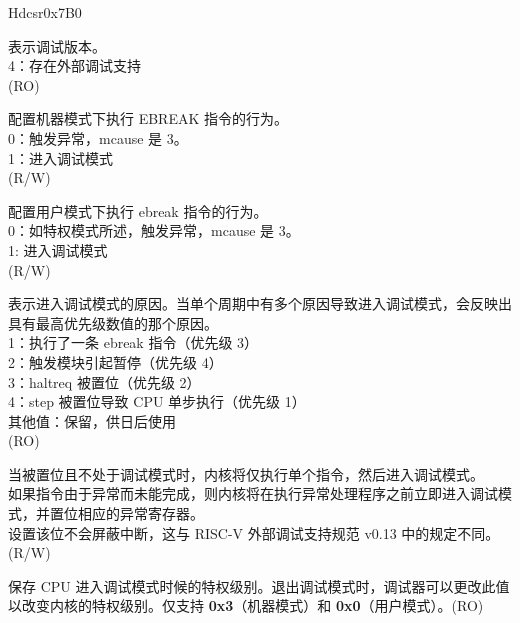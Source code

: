 \begin{register}{H}{dcsr}{0x7B0}\label{regdesc:LPDCSR}
%
%
%
%
%
%
%
%
%
%
\regnewline%
\begin{regdesc}\begin{reglist}
\label{xdebugver}\item [xdebugver] 表示调试版本。\\
4：存在外部调试支持\\
(RO)
\label{ebreakm}\item [ebreakm] 配置机器模式下执行 EBREAK 指令的行为。\\
0：触发异常，mcause 是 3。\\
1：进入调试模式\\
(R/W)
\label{ebreaku}\item [ebreaku] 配置用户模式下执行 ebreak 指令的行为。\\
0：如特权模式所述，触发异常，mcause 是 3。\\
1: 进入调试模式\\
(R/W)
\label{cause}\item [cause] 表示进入调试模式的原因。当单个周期中有多个原因导致进入调试模式，会反映出具有最高优先级数值的那个原因。\\
1：执行了一条 ebreak 指令（优先级 3）\\
2：触发模块引起暂停（优先级 4）\\
3：haltreq 被置位（优先级 2）\\
4：step 被置位导致 CPU 单步执行（优先级 1）\\
其他值：保留，供日后使用\\
(RO)
\label{step}\item [step] 当被置位且不处于调试模式时，内核将仅执行单个指令，然后进入调试模式。\\
如果指令由于异常而未能完成，则内核将在执行异常处理程序之前立即进入调试模式，并置位相应的异常寄存器。\\
设置该位不会屏蔽中断，这与 RISC-V 外部调试支持规范 v0.13 中的规定不同。\\(R/W)
\label{prv}\item [prv] 保存 CPU 进入调试模式时候的特权级别。退出调试模式时，调试器可以更改此值以改变内核的特权级别。仅支持 \textbf{0x3}（机器模式）和 \textbf{0x0}（用户模式）。(RO)
\end{reglist}\end{regdesc}
\end{register}

